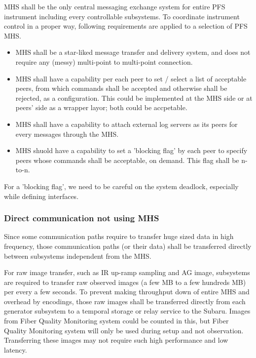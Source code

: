 \documentclass[a4paper,notitlepage]{article}
\begin{document}
MHS shall be the only central messaging exchange system for entire PFS 
instrument including every controllable subsystems. 
To coordinate instrument control in a proper way, 
following requirements are applied to a selection of PFS MHS. 

\begin{itemize}
  \item MHS shall be a star-liked message transfer and delivery system, 
    and does not require any (messy) multi-point to multi-point connection.
  \item MHS shall have a capability per each peer to set / select 
    a list of acceptable peers, from which commands shall be accepted and 
    otherwise shall be rejected, as a configuration. 
    This could be implemented at the MHS side or at peers' side as a wrapper 
    layor; both could be accpetable.
  \item MHS shall have a capability to attach external log servers as its 
    peers for every messages through the MHS. 
  \item MHS shuold have a capability to set a 'blocking flag' by each peer 
    to specify peers whose commands shall be acceptable, on demand.
    This flag shall be n-to-n. 
\end{itemize}

For a 'blocking flag', we need to be careful on the system deadlock, 
especially while defining interfaces. 

\subsubsection{Direct communication not using MHS}

Since some communication paths require to transfer huge sized data in high 
frequency, those communication paths (or their data) shall be transferred 
directly between subsystems independent from the MHS. 

For raw image transfer, such as IR up-ramp sampling and AG image, 
subsystems are required to transfer raw observed images (a few MB to a few 
hundreds MB) per every a few seconds. To prevent making throughput down of 
entire MHS and overhead by encodings, 
those raw images shall be transferred directly from 
each generator subsystem to a temporal storage or relay service to the 
Subaru. 
Images from Fiber Quality Monitoring system could be counted in this, 
but Fiber Quality Monitoring system will only be used 
during setup and not observation. Transferring these images may not require 
such high performance and low latency. 
\end{document}
